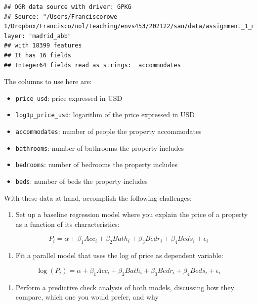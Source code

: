 \documentclass[
]{book}
\providecommand{\tightlist}{%
  \setlength{\itemsep}{0pt}\setlength{\parskip}{0pt}}
\begin{document}
\begin{verbatim}
## OGR data source with driver: GPKG 
## Source: "/Users/Franciscorowe 1/Dropbox/Francisco/uol/teaching/envs453/202122/san/data/assignment_1_madrid/madrid_abb.gpkg", layer: "madrid_abb"
## with 18399 features
## It has 16 fields
## Integer64 fields read as strings:  accommodates
\end{verbatim}

The columns to use here are:

\begin{itemize}
\tightlist
\item
  \texttt{price\_usd}: price expressed in USD
\item
  \texttt{log1p\_price\_usd}: logarithm of the price expressed in USD
\item
  \texttt{accommodates}: number of people the property accommodates
\item
  \texttt{bathrooms}: number of bathrooms the property includes
\item
  \texttt{bedrooms}: number of bedrooms the property includes
\item
  \texttt{beds}: number of beds the property includes
\end{itemize}

With these data at hand, accomplish the following challenges:

\begin{enumerate}
\def\labelenumi{\arabic{enumi}.}
\tightlist
\item
  Set up a baseline regression model where you explain the price of a property as a function of its characteristics:
\end{enumerate}

\[
P_i = \alpha + \beta_1 Acc_i + \beta_2 Bath_i + \beta_3 Bedr_i + \beta_4 Beds_i + \epsilon_i
\]

\begin{enumerate}
\def\labelenumi{\arabic{enumi}.}
\setcounter{enumi}{1}
\tightlist
\item
  Fit a parallel model that uses the log of price as dependent variable:
\end{enumerate}

\[
\log(P_i) = \alpha + \beta_1 Acc_i + \beta_2 Bath_i + \beta_3 Bedr_i + \beta_4 Beds_i + \epsilon_i
\]

\begin{enumerate}
\def\labelenumi{\arabic{enumi}.}
\setcounter{enumi}{2}
\tightlist
\item
  Perform a predictive check analysis of both models, discussing how they compare, which one you would prefer, and why
\end{enumerate}
\end{document}
